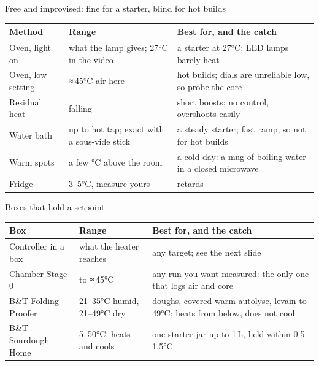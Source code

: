 \documentclass[aspectratio=169,11pt]{beamer}
\newcommand{\tablesetup}{\renewcommand{\arraystretch}{1.2}\setlength{\tabcolsep}{4pt}}
\newenvironment{tablebox}[1][\footnotesize]{\par\tablesetup#1}{\par}
\begin{document}
\begin{frame}{Free and improvised: fine for a starter, blind for hot builds}
  \begin{tablebox}[\footnotesize]
  \begin{tabularx}{\linewidth}{@{}l l Y@{}}
    \toprule
    Method & Range & Best for, and the catch \\
    \midrule
    Oven, light on & what the lamp gives; 27°C in the video & a starter at 27°C; LED lamps barely heat \\
    Oven, low setting & ≈\,45°C air here & hot builds; dials are unreliable low, so probe the core \\
    Residual heat & falling & short boosts; no control, overshoots easily \\
    Water bath & up to hot tap; exact with a sous-vide stick & a steady starter; fast ramp, so not for hot builds \\
    Warm spots & a few °C above the room & a cold day: a mug of boiling water in a closed microwave \\
    Fridge & 3--5°C, measure yours & retards \\
    \bottomrule
  \end{tabularx}
  \end{tablebox}
\end{frame}

\begin{frame}{Boxes that hold a setpoint}
  \begin{tablebox}[\footnotesize]
  \begin{tabularx}{\linewidth}{@{}l l Y@{}}
    \toprule
    Box & Range & Best for, and the catch \\
    \midrule
    Controller in a box & what the heater reaches & any target; see the next slide \\
    Chamber Stage 0 & to ≈\,45°C & any run you want measured: the only one that logs air and core \\
    B\&T Folding Proofer & 21--35°C humid, 21--49°C dry & doughs, covered warm autolyse, levain to 49°C; heats from below, does not cool \\
    B\&T Sourdough Home & 5--50°C, heats and cools & one starter jar up to 1\,L, held within 0.5--1.5°C \\
    \bottomrule
  \end{tabularx}
  \end{tablebox}
\end{frame}
\end{document}
